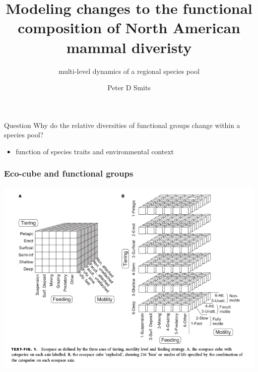 \documentclass[aspectratio=169]{beamer}
\title{Modeling changes to the functional composition of North American mammal diveristy}
\subtitle{multi-level dynamics of a regional species pool}
\author{Peter D Smits}
\institute{Department of Integrative Biology, University of California -- Berkeley}
\date{}
\begin{document}
\begin{frame}
  \maketitle
\end{frame}


\begin{frame}
  \begin{alertblock}{Question}
    \alert{Why} do the relative diversities of functional groups change within a species pool?
    \begin{itemize}
      \item function of \alert{species traits} and \alert{environmental context}
    \end{itemize}
  \end{alertblock}
\end{frame}


\begin{frame}
  \frametitle{Eco-cube and functional groups}

  \begin{center}
    \includegraphics[height=0.775\textheight,width=\textwidth,keepaspectratio=true]{figure/ecocube}
  \end{center}

  \tiny{}
\end{frame}
\end{document}
